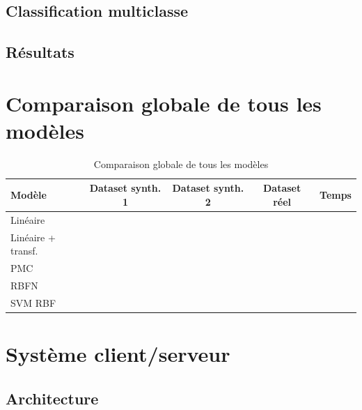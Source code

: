\documentclass[12pt, a4paper]{report}
\begin{document}

\subsection{Classification multiclasse}


\subsection{Résultats}


\section{Comparaison globale de tous les modèles}


\begin{table}[H]
\centering
\begin{tabular}{lcccc}
\toprule
\textbf{Modèle} & \textbf{Dataset synth. 1} & \textbf{Dataset synth. 2} & \textbf{Dataset réel} & \textbf{Temps} \\
\midrule
Linéaire & & & & \\
Linéaire + transf. & & & & \\
PMC & & & & \\
RBFN & & & & \\
SVM RBF & & & & \\
\bottomrule
\end{tabular}
\caption{Comparaison globale de tous les modèles}
\end{table}

\section{Système client/serveur}

\subsection{Architecture}
\end{document}
